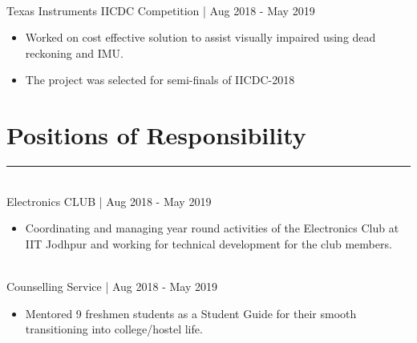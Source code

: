 \documentclass[]{resume}
\begin{document}
\begin{minipage}[t]{0.66\textwidth}
\vspace{-0.7em}
\hspace{1em}
\\
\hspace*{1em}Texas Instruments IICDC Competition | Aug 2018 - May 2019  \\ 
\vspace{-2.3em}
\descript{}
\begin{itemize}
    \item Worked on cost effective solution to assist visually impaired using dead reckoning and IMU.
    \vspace{-0.6em}\\
    \item The project was selected for semi-finals of IICDC-2018
\end{itemize}
\sectionsep


\vspace{-1.5em}

\section{Positions of Responsibility}
\vspace{-0.5em}
\noindent\rule{12.5cm}{0.4pt}

\vspace{0.5em}
\hspace{1em}
\\
\hspace*{1em} Electronics CLUB | Aug 2018 - May 2019\\
\vspace{-2.3em}
\descript{}
\begin{itemize}
    \item Coordinating and managing year round activities of the Electronics Club at IIT Jodhpur and working for technical development for the club members.
\end{itemize}

\vspace{-0.7em}
\hspace{1em}%
\\
\hspace*{1em} Counselling Service | Aug 2018 - May 2019\\
\vspace{-2.3em}
\descript{}
\begin{itemize}
    \item Mentored 9 freshmen students as a Student Guide for their smooth transitioning into college/hostel life.
\end{itemize}



\end{minipage}
\end{document}
